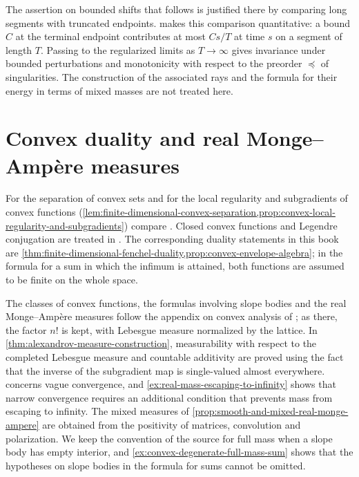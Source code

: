 The assertion on bounded shifts that follows \cite[Example~4.3.1]{XiaSampleBook} is justified there by comparing long segments with truncated endpoints.  makes this comparison quantitative: a bound $C$ at the terminal endpoint contributes at most $Cs/T$ at time $s$ on a segment of length $T$. Passing to the regularized limits as $T\to\infty$ gives invariance under bounded perturbations and monotonicity with respect to the preorder $\preceq$ of singularities. The construction of the associated rays and the formula for their energy in terms of mixed masses are not treated here.

\section{Convex duality and real Monge--Amp\`ere measures}
\label{sec:history-convex-measures}
For the separation of convex sets and for the local regularity and subgradients of convex functions (\cref{lem:finite-dimensional-convex-separation,prop:convex-local-regularity-and-subgradients}) compare \cite[Theorem 2.1.10 and Corollaries 2.1.11--2.1.13; Theorem 2.1.22]{Hor07}. Closed convex functions and Legendre conjugation are treated in \cite[Propositions 2.2.1--2.2.2 and Theorem 2.2.4; Theorem 2.2.5; Theorem 2.2.8]{Hor07}. The corresponding duality statements in this book are \cref{thm:finite-dimensional-fenchel-duality,prop:convex-envelope-algebra}; in the formula for a sum in which the infimum is attained, both functions are assumed to be finite on the whole space.

The classes of convex functions, the formulas involving slope bodies and the real Monge--Amp\`ere measures follow the appendix on convex analysis of \cite{XiaSampleBook}; as there, the factor $n!$ is kept, with Lebesgue measure normalized by the lattice. In \cref{thm:alexandrov-measure-construction}, measurability with respect to the completed Lebesgue measure and countable additivity are proved using the fact that the inverse of the subgradient map is single-valued almost everywhere.  concerns vague convergence, and \cref{ex:real-mass-escaping-to-infinity} shows that narrow convergence requires an additional condition that prevents mass from escaping to infinity. The mixed measures of \cref{prop:smooth-and-mixed-real-monge-ampere} are obtained from the positivity of matrices, convolution and polarization. We keep the convention of the source for full mass when a slope body has empty interior, and \cref{ex:convex-degenerate-full-mass-sum} shows that the hypotheses on slope bodies in the formula for sums cannot be omitted.

